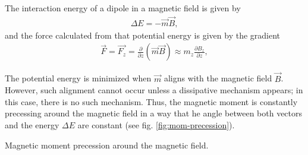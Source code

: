\documentclass{article}
\begin{document}
The interaction energy of a dipole in a magnetic field is given by
\begin{align}\label{eq:maginteraction}
  \Delta E = -\vec{m}\vec{B},
\end{align}
and the force calculated from that potential energy is given by the gradient
\begin{align}\label{eq:magforce}
  \vec{F} = \vec{F_z} = \frac{\partial}{\partial z}(\vec{m}\vec{B})\approx m_z\frac{\partial B_z}{\partial z},
\end{align}

The potential energy is minimized when $\vec{m}$ aligns with the magnetic field $\vec{B}$. However, such alignment cannot occur unless a dissipative mechanism appears; in this case, there is no such mechanism. Thus, the magnetic moment is constantly precessing around the magnetic field in a way that he angle between both vectors and the energy $\Delta E$ are constant (see fig. \ref{fig:mom-precession}).
\begin{marginfigure}%
  \begin{centering}
    \caption{Magnetic moment precession around the magnetic field.}\label{fig:mom-precession}
  \end{centering}
\end{marginfigure}
\end{document}
